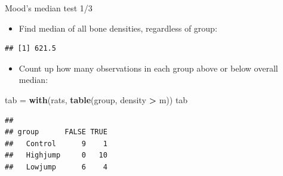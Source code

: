 \documentclass[ignorenonframetext,]{beamer}
\newenvironment{Shaded}{\begin{snugshade}}{\end{snugshade}}
\newcommand{\DataTypeTok}[1]{\textcolor[rgb]{0.13,0.29,0.53}{#1}}
\newcommand{\KeywordTok}[1]{\textcolor[rgb]{0.13,0.29,0.53}{\textbf{#1}}}
\newcommand{\NormalTok}[1]{#1}
\newcommand{\OperatorTok}[1]{\textcolor[rgb]{0.81,0.36,0.00}{\textbf{#1}}}
\newcommand{\StringTok}[1]{\textcolor[rgb]{0.31,0.60,0.02}{#1}}
\providecommand{\tightlist}{%
  \setlength{\itemsep}{0pt}\setlength{\parskip}{0pt}}
\begin{document}
\begin{frame}[fragile]{Mood's median test 1/3}
\protect\hypertarget{moods-median-test-13}{}

\begin{itemize}
\tightlist
\item
  Find median of all bone densities, regardless of group:
\end{itemize}

\begin{Shaded}
\end{Shaded}

\begin{verbatim}
## [1] 621.5
\end{verbatim}

\begin{itemize}
\tightlist
\item
  Count up how many observations in each group above or below overall
  median:
\end{itemize}

\begin{Shaded}
\begin{Highlighting}[]
\NormalTok{tab =}\StringTok{ }\KeywordTok{with}\NormalTok{(rats, }\KeywordTok{table}\NormalTok{(group, density }\OperatorTok{>}\StringTok{ }\NormalTok{m))}
\NormalTok{tab}
\end{Highlighting}
\end{Shaded}

\begin{verbatim}
##           
## group      FALSE TRUE
##   Control      9    1
##   Highjump     0   10
##   Lowjump      6    4
\end{verbatim}

\end{frame}
\end{document}
